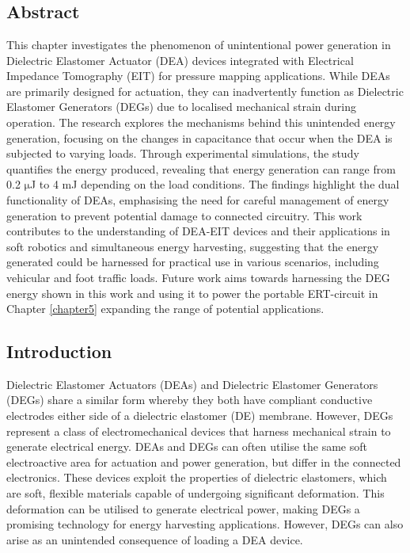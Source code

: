 \chapter{\chapviiname}
\label{chapter7}



\section*{Abstract}
	This chapter investigates the phenomenon of unintentional power generation in Dielectric Elastomer Actuator (DEA) devices integrated with Electrical Impedance Tomography (EIT) for pressure mapping applications. While DEAs are primarily designed for actuation, they can inadvertently function as Dielectric Elastomer Generators (DEGs) due to localised mechanical strain during operation. The research explores the mechanisms behind this unintended energy generation, focusing on the changes in capacitance that occur when the DEA is subjected to varying loads. Through experimental simulations, the study quantifies the energy produced, revealing that energy generation can range from 0.2 $\mathrm{\mu}$J to 4 mJ depending on the load conditions. The findings highlight the dual functionality of DEAs, emphasising the need for careful management of energy generation to prevent potential damage to connected circuitry. This work contributes to the understanding of DEA-EIT devices and their applications in soft robotics and simultaneous energy harvesting, suggesting that the energy generated could be harnessed for practical use in various scenarios, including vehicular and foot traffic loads. Future work aims towards harnessing the DEG energy shown in this work and using it to power the portable ERT-circuit in Chapter \ref{chapter5} expanding the range of potential applications.



\section{Introduction} %
\label{sec:introduction}
Dielectric Elastomer Actuators (DEAs) and Dielectric Elastomer Generators (DEGs) share a similar form whereby they both have compliant conductive electrodes either side of a dielectric elastomer (DE) membrane. However, DEGs represent a class of electromechanical devices that harness mechanical strain to generate electrical energy. DEAs and DEGs can often utilise the same soft electroactive area for actuation and power generation, but differ in the connected electronics. These devices exploit the properties of dielectric elastomers, which are soft, flexible materials capable of undergoing significant deformation. This deformation can be utilised to generate electrical power, making DEGs a promising technology for energy harvesting applications. However, DEGs can also arise as an unintended consequence of loading a DEA device.

